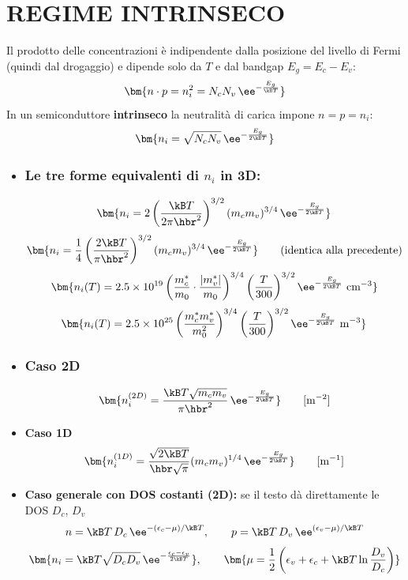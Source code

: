\section{REGIME INTRINSECO}
Il prodotto delle concentrazioni è indipendente dalla posizione del livello di Fermi (quindi dal drogaggio) e dipende solo da $T$ e dal bandgap $E_g=E_c-E_v$:
\[ \bm{n\cdot p = n_i^2 = N_cN_v\,\ee^{-\frac{E_g}{\kB T}}} \]
In un semiconduttore \textbf{intrinseco} la neutralità di carica impone $n=p=n_i$:
\[ \bm{n_i = \sqrt{N_cN_v}\,\ee^{-\frac{E_g}{2\kB T}}} \]

\begin{itemize}
    \item \subsubsection*{Le tre forme equivalenti di $n_i$ in 3D:}
\[ \bm{n_i = 2\left(\frac{\kB T}{2\pi\hbr^2}\right)^{3/2}(m_c m_v)^{3/4}\,\ee^{-\frac{E_g}{2\kB T}}} \]
\[ \bm{n_i = \frac14\left(\frac{2\kB T}{\pi\hbr^2}\right)^{3/2}(m_cm_v)^{3/4}\,\ee^{-\frac{E_g}{2\kB T}}} \qquad\text{(identica alla precedente)} \]
\[ \bm{n_i(T) = 2.5\times10^{19}\left(\frac{m_c^*}{m_0}\cdot\frac{|m_v^*|}{m_0}\right)^{3/4}\left(\frac{T}{300}\right)^{3/2}\ee^{-\frac{E_g}{2\kB T}}\ \text{cm}^{-3}} \]
\[ \bm{n_i(T) = 2.5\times10^{25}\left(\frac{m_c^*m_v^*}{m_0^2}\right)^{3/4}\left(\frac{T}{300}\right)^{3/2}\ee^{-\frac{E_g}{2\kB T}}\ \text{m}^{-3}} \]

\item \subsubsection*{Caso 2D}
\[ \bm{n_i^{(2D)} = \frac{\kB T\sqrt{m_cm_v}}{\pi\hbr^2}\,\ee^{-\frac{E_g}{2\kB T}}} \qquad [\text{m}^{-2}] \]
\item \textbf{Caso 1D}
\[ \bm{n_i^{(1D)} = \frac{\sqrt{2\kB T}}{\hbr\sqrt\pi}(m_cm_v)^{1/4}\,\ee^{-\frac{E_g}{2\kB T}}} \qquad [\text{m}^{-1}] \]
\item \textbf{Caso generale con DOS costanti (2D):} se il testo dà direttamente le DOS $D_c$, $D_v$
\[ n = \kB T\,D_c\,\ee^{-(\epsilon_c-\mu)/\kB T}, \qquad p = \kB T\,D_v\,\ee^{(\epsilon_v-\mu)/\kB T} \]
\[ \bm{n_i = \kB T\sqrt{D_cD_v}\,\ee^{-\frac{\epsilon_c-\epsilon_v}{2\kB T}}}, \qquad
   \bm{\mu = \frac12\left(\epsilon_v+\epsilon_c+\kB T\ln\frac{D_v}{D_c}\right)} \]
\end{itemize}

